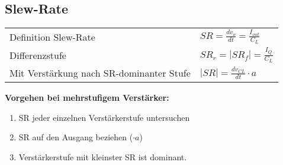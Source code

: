 \newpage

\subsection{Slew-Rate}
\begin{multicols}{2}
\begin{tabularx}{0.95\linewidth}{Xl}
	Definition Slew-Rate & $SR = \frac{d v_o}{dt} = \frac{I_{out}}{C_L}$ \\
	Differenzstufe & $SR_r = |SR_f| = \frac{I_Q}{C_L}$ \\
	Mit Verstärkung nach SR-dominanter Stufe & $|SR| = \frac{d v_{CL}}{dt} \cdot a$ \\
\end{tabularx}

\columnbreak

\textbf{Vorgehen bei mehrstufigem Verstärker:}
\begin{enumerate}
	\item SR jeder einzelnen Verstärkerstufe untersuchen
	\item SR auf den Ausgang beziehen ($\cdot a$)
	\item Verstärkerstufe mit kleinster SR ist dominant.
\end{enumerate}
\end{multicols}